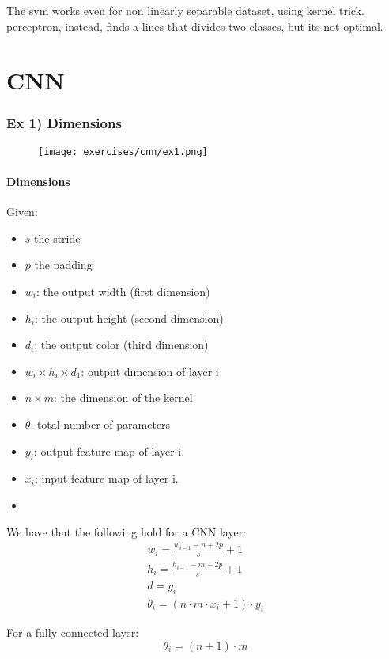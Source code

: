The svm works even for non linearly separable dataset, using kernel trick. perceptron, instead, finds a lines that divides two classes, but its not optimal.


\section{CNN}


\subsubsection{Ex 1) Dimensions}
\begin{figure}[H]
    \centering
    \texttt{[image: exercises/cnn/ex1.png]}
\end{figure}

\paragraph{Dimensions}
Given:
\begin{itemize}
\item $s$ the stride 
\item $p$ the padding
\item $w_i$: the output width (first dimension)
\item $h_i$: the output height (second dimension)
\item $d_i$: the output color (third dimension)
\item $w_i\times h_i\times d_1$: output dimension of layer i
\item $n\times m$: the dimension of the kernel
\item $\theta$: total number of parameters
\item $y_i$: output feature map of layer i.
\item $x_i$: input feature map of layer i.
\item 
\end{itemize}

We have that the following hold for a CNN layer:
\begin{equation}
\begin{aligned}
w_i=\frac{w_{i-1}-n+2p}{s}+1\\
h_i=\frac{h_{i-1}-m+2p}{s}+1\\
d=y_i\\
\theta_i=(n\cdot m \cdot x_i+1)\cdot  y_i 
\end{aligned}
\end{equation}

For a fully connected layer:
$$\theta_i=(n +1)\cdot m $$

